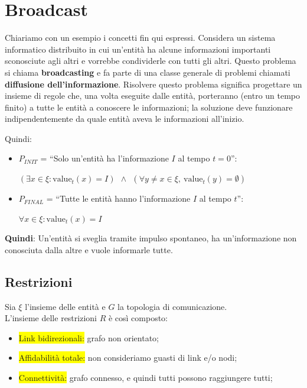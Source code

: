 
\chapter{Broadcast}
Chiariamo con un esempio i concetti fin qui espressi. Considera un sistema informatico distribuito in cui un'entità ha alcune informazioni importanti sconosciute agli altri e vorrebbe condividerle con tutti gli altri.
Questo problema si chiama \textbf{broadcasting} e fa parte di una classe generale di problemi chiamati \textbf{diffusione dell'informazione}. Risolvere questo problema significa progettare un insieme di regole che, una volta eseguite dalle entità, porteranno (entro un tempo finito) a tutte le entità a conoscere le informazioni; la soluzione deve funzionare indipendentemente da quale entità aveva le informazioni all'inizio.

Quindi:
\begin{itemize}
    \item $P_{INIT}$ = ``Solo un'entità ha l'informazione $I$ al tempo $t=0$'':
    \begin{center}
      $(\exists x \in \xi : \textrm{value}_t(x) = I) ~~ \wedge ~~ (\forall y \neq x \in \xi,~\textrm{value}_t(y) = \emptyset)$
    \end{center}
    \item $P_{FINAL}$ = ``Tutte le entità hanno l'informazione $I$ al tempo $t$'':
    \begin{center}
      $\forall x \in \xi : \textrm{value}_t(x) = I$ 
    \end{center}
\end{itemize}

\textbf{Quindi}: Un'entità si sveglia tramite impulso spontaneo, ha un'informazione non conosciuta dalla altre e vuole informarle tutte.

\section{Restrizioni}
Sia $\xi$ l'insieme delle entità e $G$ la topologia di comunicazione.\\
L'insieme delle restrizioni $R$ è così composto:
\begin{itemize}
  \item \colorbox{yellow}{Link bidirezionali:} grafo non orientato;
  \item \colorbox{yellow}{Affidabilità totale:} non consideriamo guasti di link e/o nodi;
  \item \colorbox{yellow}{Connettività:} grafo connesso, e quindi tutti possono raggiungere tutti;
\end{itemize}

